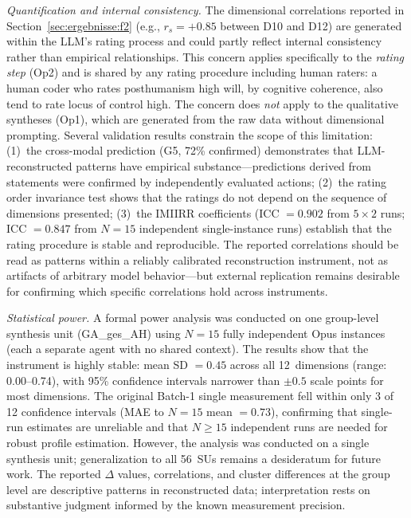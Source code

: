 \documentclass[12pt,a4paper]{article}
\begin{document}
\emph{Quantification and internal consistency.} The dimensional correlations reported in Section~\ref{sec:ergebnisse:f2} (e.g., $r_s = +0.85$ between D10 and D12) are generated within the LLM's rating process and could partly reflect internal consistency rather than empirical relationships. This concern applies specifically to the \emph{rating step} (Op2) and is shared by any rating procedure including human raters: a human coder who rates posthumanism high will, by cognitive coherence, also tend to rate locus of control high. The concern does \emph{not} apply to the qualitative syntheses (Op1), which are generated from the raw data without dimensional prompting. Several validation results constrain the scope of this limitation: (1)~the cross-modal prediction (G5, 72\% confirmed) demonstrates that LLM-reconstructed patterns have empirical substance---predictions derived from statements were confirmed by independently evaluated actions; (2)~the rating order invariance test shows that the ratings do not depend on the sequence of dimensions presented; (3)~the IMIIRR coefficients (ICC $= 0.902$ from $5 \times 2$ runs; ICC $= 0.847$ from $N = 15$ independent single-instance runs) establish that the rating procedure is stable and reproducible. The reported correlations should be read as patterns within a reliably calibrated reconstruction instrument, not as artifacts of arbitrary model behavior---but external replication remains desirable for confirming which specific correlations hold across instruments.

\emph{Statistical power.} A formal power analysis was conducted on one group-level synthesis unit (GA\_ges\_AH) using $N = 15$ fully independent Opus instances (each a separate agent with no shared context). The results show that the instrument is highly stable: mean SD $= 0.45$ across all 12~dimensions (range: 0.00--0.74), with 95\% confidence intervals narrower than $\pm 0.5$ scale points for most dimensions. The original Batch-1 single measurement fell within only 3 of 12 confidence intervals (MAE to $N = 15$ mean $= 0.73$), confirming that single-run estimates are unreliable and that $N \geq 15$ independent runs are needed for robust profile estimation. However, the analysis was conducted on a single synthesis unit; generalization to all 56~SUs remains a desideratum for future work. The reported $\Delta$ values, correlations, and cluster differences at the group level are descriptive patterns in reconstructed data; interpretation rests on substantive judgment informed by the known measurement precision.
\end{document}
